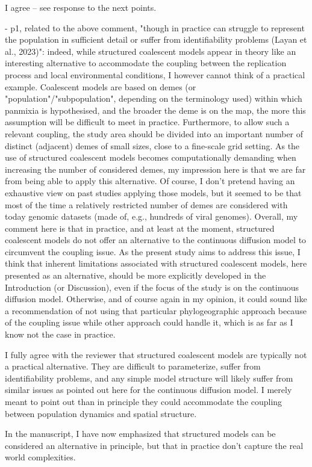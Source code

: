 \documentclass[11pt, oneside]{article}   	%
\newcommand{\response}[1]{{\color{black}{\bf Response:} #1}}
\begin{document}
\response{I agree -- see response to the next points.}

- p1, related to the above comment, "though in practice can struggle to represent the population in sufficient detail or suffer from identifiability problems (Layan et al., 2023)": indeed, while structured coalescent models appear in theory like an interesting alternative to accommodate the coupling between the replication process and local environmental conditions, I however cannot think of a practical example. Coalescent models are based on demes (or "population"/"subpopulation", depending on the terminology used) within which panmixia is hypothesised, and the broader the deme is on the map, the more this assumption will be difficult to meet in practice. Furthermore, to allow such a relevant coupling, the study area should be divided into an important number of distinct (adjacent) demes of small sizes, close to a fine-scale grid setting. As the use of structured coalescent models becomes computationally demanding when increasing the number of considered demes, my impression here is that we are far from being able to apply this alternative. Of course, I don't pretend having an exhaustive view on past studies applying those models, but it seemed to be that most of the time a relatively restricted number of demes are considered with today genomic datasets (made of, e.g., hundreds of viral genomes). Overall, my comment here is that in practice, and at least at the moment, structured coalescent models do not offer an alternative to the continuous diffusion model to circumvent the coupling issue. As the present study aims to address this issue, I think that inherent limitations associated with structured coalescent models, here presented as an alternative, should be more explicitly developed in the Introduction (or Discussion), even if the focus of the study is on the continuous diffusion model. Otherwise, and of course again in my opinion, it could sound like a recommendation of not using that particular phylogeographic approach because of the coupling issue while other approach could handle it, which is as far as I know not the case in practice.

\response{I fully agree with the reviewer that structured coalescent models are typically not a practical alternative. They are difficult to parameterize, suffer from identifiability problems, and any simple model structure will likely suffer from similar issues as pointed out here for the continuous diffusion model.
I merely meant to point out than in principle they could accommodate the coupling between population dynamics and spatial structure.

In the manuscript, I have now emphasized that structured models can be considered an alternative in principle, but that in practice don't capture the real world complexities.
}
\end{document}
